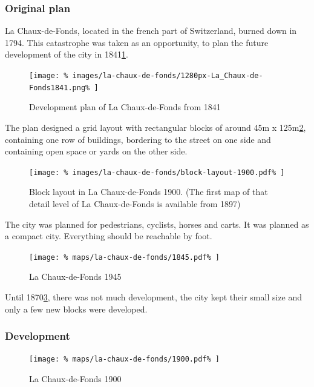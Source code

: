\documentclass[twocolumn]{article}
\begin{document}
		
			\subsubsection{Original plan}
			La Chaux-de-Fonds, located in the french part of Switzerland, burned down in 1794.
			This catastrophe was taken as an opportunity, to plan the future development of the city in 1841\ref{fig:map:plan-la-chaux-de-fonds-1841}.
		
			\begin{figure}[H]
				\texttt{[image: \%
					images/la-chaux-de-fonds/1280px-La\_Chaux-de-Fonds1841.png\%
				]}
				\caption{Development plan of La Chaux-de-Fonds from 1841\cite{Wikimedia:LaChauxDeFonds1841}}
				\label{fig:map:plan-la-chaux-de-fonds-1841}
			\end{figure}
			
			
			The plan designed a grid layout with rectangular blocks of around 45m x 125m\ref{fig:img:la-chaux-de-fonds-block-layout-1900}, containing one row of buildings, bordering to the street on one side and containing open space or yards on the other side.
			
			\begin{figure}[H]
				\texttt{[image: \%
					images/la-chaux-de-fonds/block-layout-1900.pdf\%
				]}
				\caption{Block layout in La Chaux-de-Fonds 1900\cite{MapGeoAdmin:LaChauxDeFonds}. (The first map of that detail level of La Chaux-de-Fonds is available from 1897)}
				\label{fig:img:la-chaux-de-fonds-block-layout-1900}
			\end{figure}
			
			
			The city was planned for pedestrians, cyclists, horses and carts.
			It was planned as a compact city. Everything should be reachable by foot.
			
			
			\begin{figure}[H]
				\texttt{[image: \%
					maps/la-chaux-de-fonds/1845.pdf\%
				]}
				\caption{La Chaux-de-Fonds 1945\cite{MapGeoAdmin:LaChauxDeFonds}}
				\label{fig:map:la-chaux-de-fonds-1945}
			\end{figure}
			
			Until 1870\ref{fig:map:la-chaux-de-fonds-1945}, there was not much development, the city kept their small size and only a few new blocks were developed.
			
			
			\subsubsection{Development}
			\begin{figure}[H]
				\texttt{[image: \%
					maps/la-chaux-de-fonds/1900.pdf\%
				]}
				\caption{La Chaux-de-Fonds 1900\cite{MapGeoAdmin:LaChauxDeFonds}}
				\label{fig:map:la-chaux-de-fonds-1900}
			\end{figure}
			
\end{document}
